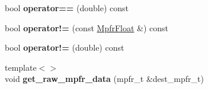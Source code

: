 \begin{DoxyCompactItemize}
bool {\bfseries operator==} (double) const
\item 
\mbox{\label{class_mpfr_float_af4718b3be363b5ef3a9a763ff5b54886}} 
bool {\bfseries operator!=} (const \hyperlink{class_mpfr_float}{Mpfr\+Float} \&) const
\item 
\mbox{\label{class_mpfr_float_aa335cd3452d48f14dca094be50a725c1}} 
bool {\bfseries operator!=} (double) const
\item 
\mbox{\label{class_mpfr_float_a8c44e086174a941b2024e3dafcfd7843}} 
{\footnotesize template$<$$>$ }\\void {\bfseries get\+\_\+raw\+\_\+mpfr\+\_\+data} (mpfr\+\_\+t \&dest\+\_\+mpfr\+\_\+t)
\end{DoxyCompactItemize}
